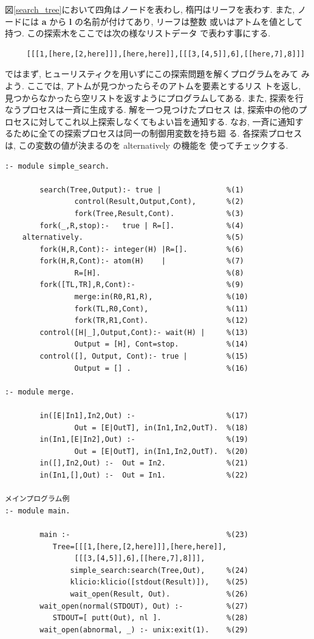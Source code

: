 \documentclass[a4,titlepage]{jsreport}
\def\em{\bf\dg}
\let\dg\bf
\begin{document}
図\ref{search_tree}において四角はノードを表わし, 楕円はリーフを表わす. 
また, ノードには {\em a} から {\em l} の名前が付けてあり, リーフは整数
或いはアトムを値として持つ.  この探索木をここでは次の様なリストデータ
で表わす事にする.
\begin{verbatim}
     [[[1,[here,[2,here]]],[here,here]],[[[3,[4,5]],6],[[here,7],8]]]
\end{verbatim}

ではまず, ヒューリスティクを用いずにこの探索問題を解くプログラムをみて
みよう.  ここでは, アトムが見つかったらそのアトムを要素とするリス
トを返し, 見つからなかったら空リストを返すようにプログラムしてある. 
また, 探索を行なうプロセスは一斉に生成する.  解を一つ見つけたプロセス
は, 探索中の他のプロセスに対してこれ以上探索しなくてもよい旨を通知する. 
なお, 一斉に通知するために全ての探索プロセスは同一の制御用変数を持ち廻
る.  各探索プロセスは, この変数の値が決まるのを alternatively の機能を
使ってチェックする.

\begin{Verbatim}[baselinestretch=0.8]
:- module simple_search.

        search(Tree,Output):- true |               %(1)
                control(Result,Output,Cont),       %(2)
                fork(Tree,Result,Cont).            %(3)
        fork(_,R,stop):-   true | R=[].            %(4)
    alternatively.                                 %(5)
        fork(H,R,Cont):- integer(H) |R=[].         %(6)
        fork(H,R,Cont):- atom(H)    |              %(7)
                R=[H].                             %(8)
        fork([TL,TR],R,Cont):-                     %(9)
                merge:in(R0,R1,R),                 %(10)
                fork(TL,R0,Cont),                  %(11)
                fork(TR,R1,Cont).                  %(12)
        control([H|_],Output,Cont):- wait(H) |     %(13) 
                Output = [H], Cont=stop.           %(14) 
        control([], Output, Cont):- true |         %(15)
                Output = [] .                      %(16) 

:- module merge.

        in([E|In1],In2,Out) :-                     %(17)
                Out = [E|OutT], in(In1,In2,OutT).  %(18)
        in(In1,[E|In2],Out) :-                     %(19)
                Out = [E|OutT], in(In1,In2,OutT).  %(20)
        in([],In2,Out) :-  Out = In2.              %(21)
        in(In1,[],Out) :-  Out = In1.              %(22)

メインプログラム例
:- module main.

        main :-                                    %(23)
           Tree=[[[1,[here,[2,here]]],[here,here]],
                [[[3,[4,5]],6],[[here,7],8]]],
               simple_search:search(Tree,Out),     %(24)
               klicio:klicio([stdout(Result)]),    %(25)
               wait_open(Result, Out).             %(26)
        wait_open(normal(STDOUT), Out) :-          %(27)
           STDOUT=[ putt(Out), nl ].               %(28)
        wait_open(abnormal, _) :- unix:exit(1).    %(29)
\end{Verbatim} 
\end{document}
